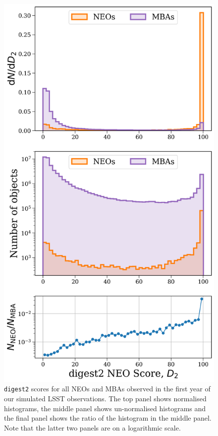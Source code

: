 \documentclass[twocolumn]{aastex631}
\newcommand{\dig}{\texttt{digest2}}
\begin{document}
\begin{figure}
    \centering
    \includegraphics[width=\columnwidth]{digest2_pollution.png}
    \caption{\dig{} scores for all NEOs and MBAs observed in the first year of our simulated LSST observations. The top panel shows normalised histograms, the middle panel shows un-normalised histograms and the final panel shows the ratio of the histogram in the middle panel. Note that the latter two panels are on a logarithmic scale.}
    \label{fig:digest2_example}
\end{figure}
\end{document}
